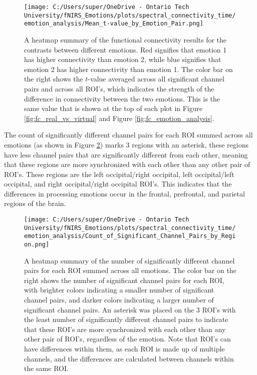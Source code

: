 \begin{figure}[H]
  \centering
  \texttt{[image: C:/Users/super/OneDrive - Ontario Tech University/fNIRS\_Emotions/plots/spectral\_connectivity\_time/emotion\_analysis/Mean\_t-value\_by\_Emotion\_Pair.png]}
  \caption[FC: Summary of Contrasts by Emotion Pair]{A heatmap summary of the functional connectivity results for the contrasts between different emotions.
  Red signifies that emotion 1 has higher connectivity than emotion 2, while blue signifies that emotion 2 has higher connectivity than emotion 1.
  The color bar on the right shows the $t$-value averaged across all significant channel pairs and across all ROI's, which indicates the strength of the difference in connectivity between the two emotions.
  This is the same value that is shown at the top of each plot in Figure \ref{fig:fc_real_vs_virtual} and Figure \ref{fig:fc_emotion_analysis}.}
  \label{fig:fc_emotion_summary_analysis}
\end{figure}

The count of significantly different channel pairs for each ROI summed across all emotions (as shown in Figure \ref{fig:fc_region_summary_analysis}) marks 3 regions with an asterisk, these regions have less channel pairs that are significantly different from each other, meaning that these regions are more synchronized with each other than any other pair of ROI's.
These regions are the left occipital/right occipital, left occipital/left occipital, and right occipital/right occipital ROI's.
This indicates that the differences in processing emotions occur in the frontal, prefrontal, and parietal regions of the brain.

\begin{figure}[H]
  \centering
  \texttt{[image: C:/Users/super/OneDrive - Ontario Tech University/fNIRS\_Emotions/plots/spectral\_connectivity\_time/emotion\_analysis/Count\_of\_Significant\_Channel\_Pairs\_by\_Region.png]}
  \caption[FC: Count of Significantly Different Channel Pairs by ROI]{A heatmap summary of the number of significantly different channel pairs for each ROI summed across all emotions. 
  The color bar on the right shows the number of significant channel pairs for each ROI, with brighter colors indicating a smaller number of significant channel pairs, and darker colors indicating a larger number of significant channel pairs.
  An asterisk was placed on the 3 ROI's with the least number of significantly different channel pairs to indicate that these ROI's are more synchronized with each other than any other pair of ROI's, regardless of the emotion.
  Note that ROI's can have differences within them, as each ROI is made up of multiple channels, and the differences are calculated between channels within the same ROI.}
  \label{fig:fc_region_summary_analysis}
\end{figure}

